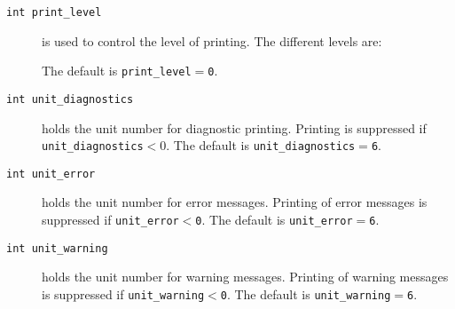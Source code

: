 
\begin{description}

\item[\texttt{int print\_level}]  is used to control the level of printing.
   The different levels are:
The default is {\tt print\_level$=$\tt 0}.

\item[\texttt{int unit\_diagnostics}]  holds the
unit number for diagnostic printing. Printing is suppressed if
{\tt unit\_diagnostics$<0$}.
The default is {\tt unit\_diagnostics$=$6}.

\item[\texttt{int unit\_error}] holds the
unit number for error messages.
Printing of error messages
is suppressed if {\tt unit\_error$<$0}.
The default is {\tt unit\_error$=$6}.

\item[\texttt{int unit\_warning}] holds the
unit number for warning messages.
Printing of warning messages is suppressed if {\tt unit\_warning$<$0}.
The default is {\tt unit\_warning$=$6}.

\end{description}




